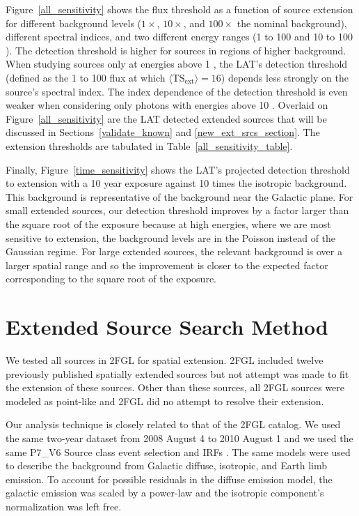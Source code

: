 \documentclass[12pt,preprint]{aastex}
\newcommand{\gev}{\text{GeV}\xspace}
\newcommand{\tsext}{{\ensuremath{\text{TS}_{\text{ext}}}}\xspace}
\newcommand{\hl}[1]{#1}
\begin{document}
\hl{
Figure~\ref{all_sensitivity} shows the flux threshold as a function of
source extension for different background levels ($1\times$, $10\times$,
and $100\times$ the nominal background), different spectral indices,
and two different energy ranges (1 \gev to 100 \gev and 10 \gev to
100 \gev).  The detection threshold is higher for sources in regions of
higher background.  When studying sources only at energies above 1 \gev,
the LAT's detection threshold (defined as the 1 \gev to 100 \gev flux at
which $\langle\tsext\rangle=16$) depends less strongly on the source's
spectral index. The index dependence of the detection threshold is
even weaker when considering only photons with energies above 10 \gev.
Overlaid on Figure~\ref{all_sensitivity} are the LAT detected extended
sources that will be discussed in Sections~\ref{validate_known} and
\ref{new_ext_srcs_section}.  The extension thresholds are tabulated in
Table~\ref{all_sensitivity_table}.

Finally, Figure~\ref{time_sensitivity} shows the LAT's projected
detection threshold to extension with a 10 year
exposure against 10 times
the isotropic background. This background is representative of the
background near the Galactic plane.  For small extended sources, our
detection threshold improves by a factor larger than the square root
of the exposure because at high energies, where we are most sensitive
to extension, the background levels are in the Poisson instead of the
Gaussian regime.  For large extended sources, the relevant background
is over a larger spatial range and so the improvement is closer to the
expected factor corresponding to the square root of the exposure.
}


\section{Extended Source Search Method}
\label{extended_source_search_method}

We tested all sources in 2FGL for spatial extension.
2FGL included
twelve previously published spatially extended sources but not
attempt was made to fit the extension of these sources. Other than these sources,
all 2FGL sources were modeled as point-like and 2FGL did no attempt
to resolve their extension.

Our analysis technique is closely related to that 
of the 2FGL catalog. We used the same two-year dataset from 2008 August 4
to 2010 August 1 and we used the same P7\_V6 Source class
event selection and IRFs \citep{lat_on_orbit_psf}.  
The same 
models were used to describe the background from Galactic diffuse, isotropic, and
Earth limb emission.  To account for possible residuals in the diffuse
emission model, the galactic emission was scaled by a power-law
and the isotropic component's normalization was left free.
\end{document}
